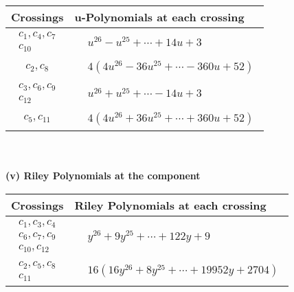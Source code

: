 \documentclass[1p]{elsarticle_modified}
\theoremstyle{definition}
\begin{document}
\begin{tabular}{m{50pt}|m{274pt}}
Crossings & \hspace{64pt}u-Polynomials at each crossing \\
\hline $$\begin{aligned}c_{1},c_{4},c_{7}\\c_{10}\end{aligned}$$&$\begin{aligned}
&u^{26}- u^{25}+\cdots+14 u+3
\end{aligned}$\\
\hline $$\begin{aligned}c_{2},c_{8}\end{aligned}$$&$\begin{aligned}
&4(4 u^{26}-36 u^{25}+\cdots-360 u+52)
\end{aligned}$\\
\hline $$\begin{aligned}c_{3},c_{6},c_{9}\\c_{12}\end{aligned}$$&$\begin{aligned}
&u^{26}+u^{25}+\cdots-14 u+3
\end{aligned}$\\
\hline $$\begin{aligned}c_{5},c_{11}\end{aligned}$$&$\begin{aligned}
&4(4 u^{26}+36 u^{25}+\cdots+360 u+52)
\end{aligned}$\\
\hline
\end{tabular}\\~\\
\newpage\renewcommand{\arraystretch}{1}
\flushleft \textbf{(v) Riley Polynomials at the component}\newline \\
\begin{tabular}{m{50pt}|m{274pt}}
Crossings & \hspace{64pt}Riley Polynomials at each crossing \\
\hline $$\begin{aligned}c_{1},c_{3},c_{4}\\c_{6},c_{7},c_{9}\\c_{10},c_{12}\end{aligned}$$&$\begin{aligned}
&y^{26}+9 y^{25}+\cdots+122 y+9
\end{aligned}$\\
\hline $$\begin{aligned}c_{2},c_{5},c_{8}\\c_{11}\end{aligned}$$&$\begin{aligned}
&16(16 y^{26}+8 y^{25}+\cdots+19952 y+2704)
\end{aligned}$\\
\hline
\end{tabular}\\~\\
\end{document}
